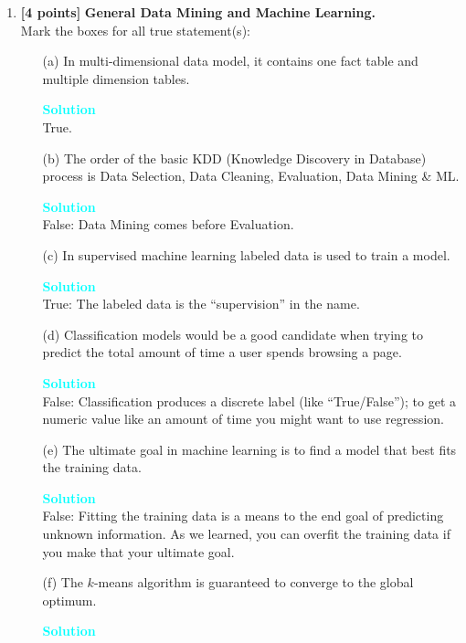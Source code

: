 \documentclass[10pt]{article}
\newenvironment{solution}
    { \begin{mdframed}[backgroundcolor=gray!10] \textcolor{cyan}{\textbf{Solution}} \\}
    {  \end{mdframed}}
\begin{document}
\begin{enumerate}

	\item \textbf{[4 points]} \textbf{General Data Mining and Machine Learning.} \\
	      Mark the boxes for all true statement(s):
	      \begin{itemize}
		      \item[(a)] In multi-dimensional data model, it contains one fact table and multiple dimension tables.
		            \begin{solution}
			            True.
		            \end{solution}
		      \item[(b)] The order of the basic KDD (Knowledge Discovery in Database) process is Data Selection, Data Cleaning, Evaluation, Data Mining \& ML.
		            \begin{solution}
			            False: Data Mining comes before Evaluation.
		            \end{solution}
		      \item[(c)] In supervised machine learning labeled data is used to train a model.
		            \begin{solution}
			            True: The labeled data is the “supervision” in the name.
		            \end{solution}
		      \item[(d)] Classification models would be a good candidate when trying to predict the total
		            amount of time a user spends browsing a page.
		            \begin{solution}
			            False: Classification produces a discrete label (like “True/False”);
			            to get a numeric value like an amount of time you might want to use regression.
		            \end{solution}
		      \item[(e)] The ultimate goal in machine learning is to find a model that best fits the training data.
		            \begin{solution}
			            False: Fitting the training data is a means to the end goal of predicting unknown
			            information.  As we learned, you can overfit the training data if you make that your
			            ultimate goal.
		            \end{solution}
		      \item[(f)] The $k$-means algorithm is guaranteed to converge to the global optimum.
		            \begin{solution}

\end{solution}
\end{itemize}
\end{enumerate}
\end{document}

